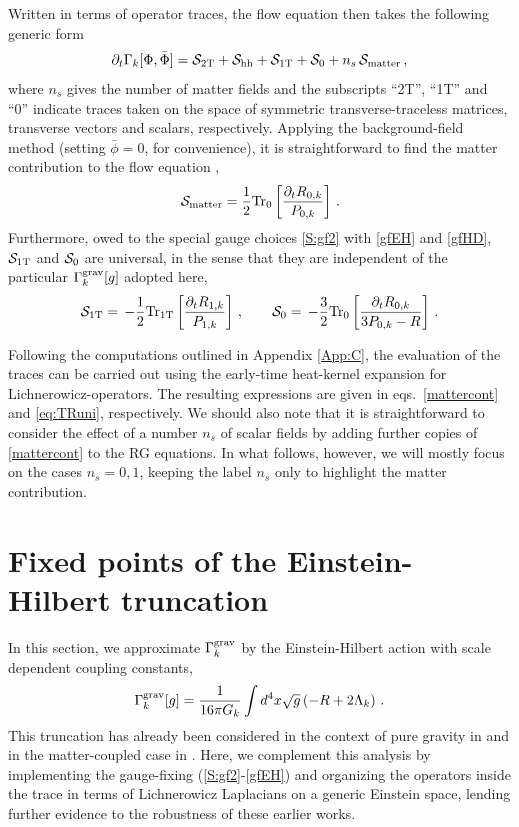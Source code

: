\documentclass[preprint,preprintnumbers,amsmath,amssymb,nofootinbib,APS]{revtex4}
\newcommand{\be}{\begin{equation}}
\newcommand{\ee}{\end{equation}}
\newcommand{\Tr}{{\rm Tr}}
\newcommand{\cS}{\mathcal{S}}
\newcommand{\2}{\sqrt{2\,}}
\newcommand{\p}{\partial}
\begin{document}
Written in terms of operator traces, the flow equation then takes the following generic form
%
\be\label{Ftrace}
\p_t \Gamma_k[\Phi, \bar{\Phi}] = \cS_{\rm 2T} + \cS_{\rm hh} + \cS_{\rm 1T} + \cS_{\rm 0} + n_s \, \cS_{\rm matter} \, , 
\ee
%
where $n_s$ gives the number of matter fields and the subscripts ``2T'', ``1T'' and ``0'' indicate traces taken on the space of symmetric transverse-traceless matrices, transverse vectors and scalars, respectively. Applying the background-field method (setting $\bar{\phi} = 0$, for convenience),
 it is straightforward to find the matter contribution
to the flow equation \cite{Dou:1997fg},
%
\be\label{mattr}
\cS_{\rm matter} = \frac{1}{2} \Tr_0 \left[ \frac{\p_t R_{0,k}}{P_{0,k}} \right] \, .
\ee
%
Furthermore, owed to the special gauge choices \eqref{S:gf2} with \eqref{gfEH} and \eqref{gfHD},
$\cS_{\rm 1T}$ and $\cS_{\rm 0}$ are universal, in the sense that they are independent of
the particular $\Gamma_k^{\rm grav}[g]$ adopted here,
%
\be\label{Tr:ghost}
\cS_{\rm 1T} = \, - \frac{1}{2} \Tr_{\rm 1T} \left[ 
\frac{\p_t R_{1,k}}{P_{1,k}}
\right] \, , \qquad  
%
\cS_{\rm 0} = \, - \frac{3}{2} \Tr_{\rm 0} \left[ 
\frac{ \p_t R_{0,k}}{3 P_{0,k} - R}
\right] \, .
\ee
%

%
Following the computations outlined in Appendix \ref{App:C}, the evaluation of the traces can be carried out using 
the early-time heat-kernel expansion for Lichnerowicz-operators. The resulting expressions are given in eqs.\ \eqref{mattercont} and \eqref{eq:TRuni}, respectively. We should also note that it is straightforward to consider the effect of a number $n_s$ of scalar fields by adding further copies of \eqref{mattercont} to the RG equations. In what follows, however, we will mostly focus on the cases $n_s =0,1$, keeping the label $n_s$ only to highlight the matter contribution.


\noindent
\section{Fixed points of the Einstein-Hilbert truncation}
\label{sec:EH}
In this section, we approximate $\Gamma_k^{\rm grav}$ by the Einstein-Hilbert action
with scale dependent coupling constants,
%
\be\label{EHtrunc}
\Gamma_k^{\rm grav}[g] = \frac{1}{16 \pi G_k} \int d^4x \sqrt{g} \left( -R + 2 \Lambda_k \right) \, .
\ee
%
This truncation has already been considered in the context of pure gravity in \cite{Reuter:2001ag,Litim:2003vp,Souma:1999at,Lauscher:2001ya} and in the matter-coupled case in \cite{Dou:1997fg,Percacci:2002ie,Percacci:2003jz,Codello:2008vh}.
Here, we complement this analysis by implementing the gauge-fixing (\ref{S:gf2}-\ref{gfEH}) and organizing the operators inside the trace in terms of Lichnerowicz Laplacians on a generic Einstein space, lending further evidence to the robustness of these earlier works.
\end{document}
